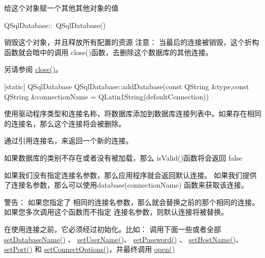 给这个对象赋一个其他其他对象的值

QSqlDatabase::~QSqlDatabase()

销毁这个对象，并且释放所有配置的资源 注意： 当最后的连接被销毁，这个折构函数就会暗中的调用 close()函数，去删除这个数据库的其他连接。

另请参阅 \href{https://github.com/QtDocumentCN/QtDocumentCN/blob/master/Src/S/QSqlDatabase/QSqlDatabase.md#void-qsqldatabaseclose}{close()}。

[static] QSqlDatabase QSqlDatabase::addDatabase(const QString \&type,const QString \&connectionName = QLatin1String(defaultConnection))

使用驱动程序类型和连接名称，将数据库添加到数据库连接列表中。如果存在相同的连接名，那么这个连接将会被删除。

通过引用连接名，来返回一个新的连接。

如果数据库的类别不存在或者没有被加载，那么 isValid()函数将会返回 false

如果我们没有指定连接名参数，那么应用程序就会返回默认连接。 如果我们提供了连接名参数，那么可以使用database(connectionName) 函数来获取该连接。

警告： 如果您指定了 相同的连接名参数，那么就会替换之前的那个相同的连接。如果您多次调用这个函数而不指定 连接名参数，则默认连接将被替换。

在使用连接之前，它必须经过初始化。比如： 调用下面一些或者全部 \href{https://github.com/QtDocumentCN/QtDocumentCN/blob/master/Src/S/QSqlDatabase/QSqlDatabase.md#void-qsqldatabasesetdatabasenameconst-qstring-name}{setDatabaseName()} 、 \href{https://github.com/QtDocumentCN/QtDocumentCN/blob/master/Src/S/QSqlDatabase/QSqlDatabase.md#void-qsqldatabasesetusernameconst-qstring-name}{setUserName()}、 \href{https://github.com/QtDocumentCN/QtDocumentCN/blob/master/Src/S/QSqlDatabase/QSqlDatabase.md#void-qsqldatabasesetpasswordconst-qstring-password}{setPassword()} 、 \href{https://github.com/QtDocumentCN/QtDocumentCN/blob/master/Src/S/QSqlDatabase/QSqlDatabase.md#void-qsqldatabasesethostnameconst-qstring-host}{setHostName()}、 \href{https://github.com/QtDocumentCN/QtDocumentCN/blob/master/Src/S/QSqlDatabase/QSqlDatabase.md#void-qsqldatabasesetportint-port}{setPort()} 和 \href{https://github.com/QtDocumentCN/QtDocumentCN/blob/master/Src/S/QSqlDatabase/QSqlDatabase.md#void-qsqldatabasesetconnectoptionsconst-qstring-options--qstring}{setConnectOptions()}，并最终调用 \href{https://github.com/QtDocumentCN/QtDocumentCN/blob/master/Src/S/QSqlDatabase/QSqlDatabase.md#bool-qsqldatabaseopen}{open()}

